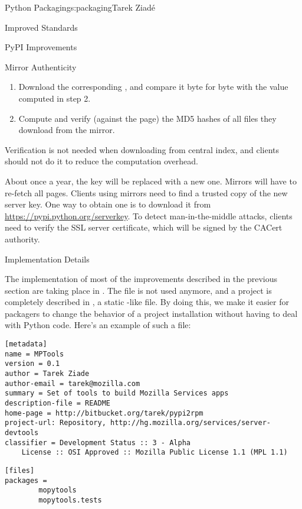 \begin{aosachapter}{Python Packaging}{s:packaging}{Tarek Ziad\'{e}}
\begin{aosasect1}{Improved Standards}
\begin{aosasect2}{PyPI Improvements}
\begin{aosasect3}{Mirror Authenticity}
\begin{enumerate}
  \item Download the corresponding , and compare it
  byte for byte with the value computed in step 2.

  \item Compute and verify (against the  page) the MD5
  hashes of all files they download from the mirror.

\end{enumerate}

Verification is not needed when downloading from central index, and
clients should not do it to reduce the computation overhead.

About once a year, the key will be replaced with a new one. Mirrors
will have to re-fetch all  pages. Clients using
mirrors need to find a trusted copy of the new server key. One way to
obtain one is to download it from
\url{https://pypi.python.org/serverkey}.  To detect man-in-the-middle
attacks, clients need to verify the SSL server certificate, which will
be signed by the CACert authority.

\end{aosasect3}

\end{aosasect2}

\end{aosasect1}

\begin{aosasect1}{Implementation Details}

The implementation of most of the improvements described in the previous
section are taking place in .  The 
file is not used anymore, and a project is completely described in
, a static -like file.  By doing this, we
make it easier for packagers to change the behavior of a project
installation without having to deal with Python code.  Here's an
example of such a file:

\begin{verbatim}
[metadata]
name = MPTools
version = 0.1
author = Tarek Ziade
author-email = tarek@mozilla.com
summary = Set of tools to build Mozilla Services apps
description-file = README
home-page = http://bitbucket.org/tarek/pypi2rpm
project-url: Repository, http://hg.mozilla.org/services/server-devtools
classifier = Development Status :: 3 - Alpha
    License :: OSI Approved :: Mozilla Public License 1.1 (MPL 1.1)
\end{verbatim}

\begin{verbatim}
[files]
packages =
        mopytools
        mopytools.tests


\end{verbatim}
\end{aosasect1}
\end{aosachapter}
